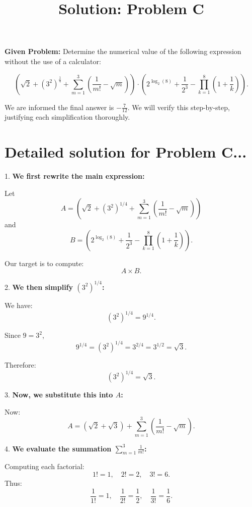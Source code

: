 \documentclass[12pt,a4paper]{article}
\begin{document}
\title{Solution: Problem C}
\date{}
\maketitle
\thispagestyle{fancy} %



\noindent\textbf{Given Problem:} Determine the numerical value of the following expression without the use of a calculator:

\[
\left( \sqrt{2} + (3^2)^{\frac{1}{4}} + \sum_{m=1}^{3} \left(\frac{1}{m!} - \sqrt{m}\right) \right) \cdot \left( 2^{\log_2(8)} + \frac{1}{2^3} - \prod_{k=1}^{8}\left(1 + \frac{1}{k}\right) \right).
\]

We are informed the final answer is \(-\frac{7}{12}\). We will verify this step-by-step, justifying each simplification thoroughly.

\section*{Detailed solution for Problem C...}

1. \textbf{We first rewrite the main expression:}
\bigskip

   Let
   \[
   A = \left(\sqrt{2} + (3^2)^{1/4} + \sum_{m=1}^{3} \left(\frac{1}{m!} - \sqrt{m}\right)\right)
   \]
   and
   \[
   B = \left(2^{\log_2(8)} + \frac{1}{2^3} - \prod_{k=1}^{8} \left(1 + \frac{1}{k}\right)\right).
   \]

   Our target is to compute:
   \[
   A \times B.
   \]

2. \textbf{We then simplify \((3^2)^{1/4}\):}

   We have:
   \[
   (3^2)^{1/4} = 9^{1/4}.
   \]

   Since \(9 = 3^2\),
   \[
   9^{1/4} = (3^2)^{1/4} = 3^{2/4} = 3^{1/2} = \sqrt{3}.
   \]

   Therefore:
   \[
   (3^2)^{1/4} = \sqrt{3}.
   \]

3. \textbf{Now, we substitute this into \(A\):}

   Now:
   \[
   A = \left(\sqrt{2} + \sqrt{3}\right) + \sum_{m=1}^{3}\left(\frac{1}{m!} - \sqrt{m}\right).
   \]




   4. \textbf{We evaluate the summation \(\sum_{m=1}^{3}\frac{1}{m!}\):}

   Computing each factorial:
   \[
   1! = 1, \quad 2! = 2, \quad 3! = 6.
   \]
   Thus:
   \[
   \frac{1}{1!} = 1,\quad \frac{1}{2!} = \frac{1}{2},\quad \frac{1}{3!} = \frac{1}{6}.
   \]
\end{document}
